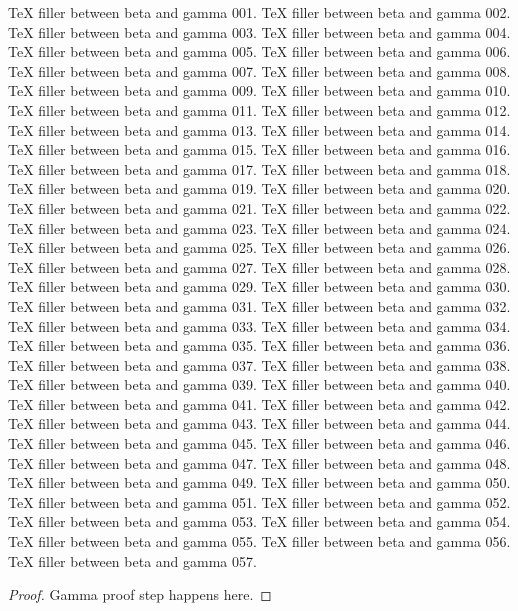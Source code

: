 TeX filler between beta and gamma 001.
TeX filler between beta and gamma 002.
TeX filler between beta and gamma 003.
TeX filler between beta and gamma 004.
TeX filler between beta and gamma 005.
TeX filler between beta and gamma 006.
TeX filler between beta and gamma 007.
TeX filler between beta and gamma 008.
TeX filler between beta and gamma 009.
TeX filler between beta and gamma 010.
TeX filler between beta and gamma 011.
TeX filler between beta and gamma 012.
TeX filler between beta and gamma 013.
TeX filler between beta and gamma 014.
TeX filler between beta and gamma 015.
TeX filler between beta and gamma 016.
TeX filler between beta and gamma 017.
TeX filler between beta and gamma 018.
TeX filler between beta and gamma 019.
TeX filler between beta and gamma 020.
TeX filler between beta and gamma 021.
TeX filler between beta and gamma 022.
TeX filler between beta and gamma 023.
TeX filler between beta and gamma 024.
TeX filler between beta and gamma 025.
TeX filler between beta and gamma 026.
TeX filler between beta and gamma 027.
TeX filler between beta and gamma 028.
TeX filler between beta and gamma 029.
TeX filler between beta and gamma 030.
TeX filler between beta and gamma 031.
TeX filler between beta and gamma 032.
TeX filler between beta and gamma 033.
TeX filler between beta and gamma 034.
TeX filler between beta and gamma 035.
TeX filler between beta and gamma 036.
TeX filler between beta and gamma 037.
TeX filler between beta and gamma 038.
TeX filler between beta and gamma 039.
TeX filler between beta and gamma 040.
TeX filler between beta and gamma 041.
TeX filler between beta and gamma 042.
TeX filler between beta and gamma 043.
TeX filler between beta and gamma 044.
TeX filler between beta and gamma 045.
TeX filler between beta and gamma 046.
TeX filler between beta and gamma 047.
TeX filler between beta and gamma 048.
TeX filler between beta and gamma 049.
TeX filler between beta and gamma 050.
TeX filler between beta and gamma 051.
TeX filler between beta and gamma 052.
TeX filler between beta and gamma 053.
TeX filler between beta and gamma 054.
TeX filler between beta and gamma 055.
TeX filler between beta and gamma 056.
TeX filler between beta and gamma 057.

\begin{proof}[Proof]
Gamma proof step happens here.
\end{proof}

